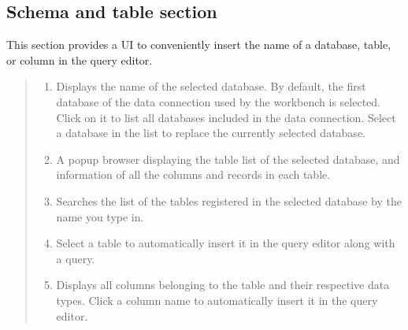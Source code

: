\documentclass[letterpaper,10pt,english]{sphinxmanual}
\begin{document}
\subsection{Schema and table section}
\label{\detokenize{discovery/part06/06_03-use_a_workbench:workbench-use-2}}\label{\detokenize{discovery/part06/06_03-use_a_workbench:id3}}
This section provides a UI to conveniently insert the name of a database, table, or column in the query editor.
\begin{quote}

\begin{figure}[H]
\centering

\noindent{}
\end{figure}
\begin{enumerate}
\def\theenumi{\arabic{enumi}}
\def\labelenumi{\theenumi .}
\makeatletter\def\p@enumii{\p@enumi \theenumi .}\makeatother
\item {} 
 Displays the name of the selected database. By default, the first database of the data connection used by the workbench is selected. Click on it to list all databases included in the data connection. Select a database in the list to replace the currently selected database.

\item {} 
 A popup browser displaying the table list of the selected database, and information of all the columns and records in each table.

\item {} 
 Searches the list of the tables registered in the selected database by the name you type in.

\item {} 
 Select a table to automatically insert it in the query editor along with a  query.

\item {} 
 Displays all columns belonging to the table and their respective data types. Click a column name to automatically insert it in the query editor.

\end{enumerate}
\end{quote}
\end{document}
